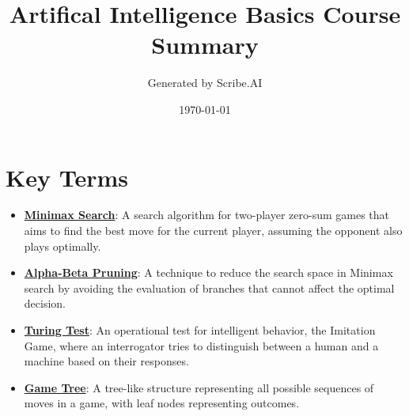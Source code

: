 \documentclass{article}%
\title{Artifical Intelligence Basics Course Summary}%
\author{Generated by Scribe.AI}%
\date{\today}%
\begin{document}
%
\normalsize%
\maketitle%
\section{Key Terms}%
\label{sec:KeyTerms}%
\begin{itemize}[leftmargin=*]%
\item \href{\url{https://purdue.brightspace.com/d2l/common/assets/pdfjs-d2l-dist/1.0.14-legacy/web/viewer.html?file=\%252Fcontent\%252Fenforced\%252F1095467-wl.202510.CS.24300.001\%252F02L2-Intro.pdf\%253Fou\%253D1095467\&lang=en-us\&container=d2l-fileviewer-rendered-pdf\&fullscreen=d2l-fileviewer-rendered-pdf-dialog\&height=667}#page=22}{\textbf{Minimax Search}}: A search algorithm for two-player zero-sum games that aims to find the best move for the current player, assuming the opponent also plays optimally.%
\item \href{\url{https://purdue.brightspace.com/d2l/common/assets/pdfjs-d2l-dist/1.0.14-legacy/web/viewer.html?file=\%252Fcontent\%252Fenforced\%252F1095467-wl.202510.CS.24300.001\%252F02L2-Intro.pdf\%253Fou\%253D1095467\&lang=en-us\&container=d2l-fileviewer-rendered-pdf\&fullscreen=d2l-fileviewer-rendered-pdf-dialog\&height=667}#page=23}{\textbf{Alpha{-}Beta Pruning}}: A technique to reduce the search space in Minimax search by avoiding the evaluation of branches that cannot affect the optimal decision.%
\item \href{\url{https://purdue.brightspace.com/d2l/common/assets/pdfjs-d2l-dist/1.0.14-legacy/web/viewer.html?file=\%252Fcontent\%252Fenforced\%252F1095467-wl.202510.CS.24300.001\%252F02L2-Intro.pdf\%253Fou\%253D1095467\&lang=en-us\&container=d2l-fileviewer-rendered-pdf\&fullscreen=d2l-fileviewer-rendered-pdf-dialog\&height=667}#page=6}{\textbf{Turing Test}}: An operational test for intelligent behavior, the Imitation Game, where an interrogator tries to distinguish between a human and a machine based on their responses.%
\item \href{\url{https://purdue.brightspace.com/d2l/common/assets/pdfjs-d2l-dist/1.0.14-legacy/web/viewer.html?file=\%252Fcontent\%252Fenforced\%252F1095467-wl.202510.CS.24300.001\%252F02L2-Intro.pdf\%253Fou\%253D1095467\&lang=en-us\&container=d2l-fileviewer-rendered-pdf\&fullscreen=d2l-fileviewer-rendered-pdf-dialog\&height=667}#page=11}{\textbf{Game Tree}}: A tree-like structure representing all possible sequences of moves in a game, with leaf nodes representing outcomes.%

\end{itemize}
\end{document}
